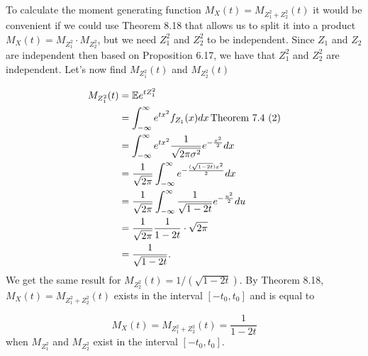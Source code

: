 
To calculate the moment generating function $ M_{X} (t) = M_{Z_1^2 + Z_2^2}(t) $ it would be
convenient if we could use Theorem 8.18 that allows us to split it into a product $ M_{X} (t) =
M_{Z_1^2} \cdot M_{Z_2^2} $, but we need $ Z_1^2$ and $ Z_2^2$ to be independent. Since $ Z_1$ and
$ Z_2$ are independent then based on Proposition 6.17, we have that $ Z_1^2$ and $ Z_2^2$ are
independent. Let's now find $ M_{Z_1^2} (t)$ and $ M_{Z_2^2}(t) $

\begin{align*}
    M_{Z_1^2} (t) &=  \mathbb{E} e^{t Z_1^2} \\
		  &= \int_{-\infty}^{\infty} e^{t x^2} f_{Z_1} (x) dx \, \mbox{Theorem 7.4 (2)} \\
		  &= \int_{-\infty}^{\infty} e^{tx^2} \frac{1}{\sqrt{2\pi \sigma^2}} e^{-
		  \frac{x^2}{2} } dx\\
		  &= \frac{1}{\sqrt{2\pi}} \int_{-\infty}^{\infty} e^{- \frac{(\sqrt{1-2t}) x^2}{2}
		  }  dx\\
		  &= \frac{1}{\sqrt{2\pi}} \int_{-\infty}^{\infty} \frac{1}{\sqrt{1-2t}}e^{-
		  \frac{u^2}{2} } du\\
		  &= \frac{1}{\sqrt{2\pi}} \frac{1}{1-2t} \cdot \sqrt{2\pi}\\
		  &= \frac{1}{\sqrt{1-2t}}.
\end{align*}
We get the same result for $ M_{Z_2^2}(t) = 1/(\sqrt{1-2t}) $. By Theorem 8.18, $M_{X} (t) =
M_{Z_1^2 + Z_2^2}(t) $ exists in the interval $ [-t_0,t_0]$ and is equal to

\[
    M_{X} (t) = M_{Z_1^2 + Z_2^2} (t) = \frac{1}{1-2t} 
\] 
when $ M_{Z_1^2} $ and $ M_{Z_2^2} $ exist in the interval $ [-t_0, t_0]$.

